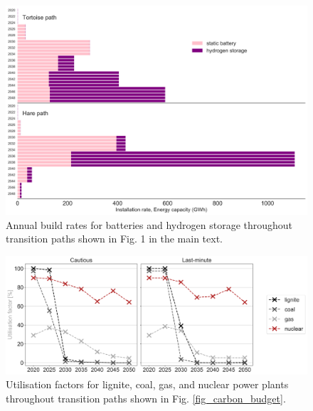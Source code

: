 \documentclass[3p]{elsarticle} %
\begin{document}
\begin{figure}[!h]
\centering
\includegraphics[width=0.8\columnwidth]{figures/storage_expansion_w_TYNDP.png}
\caption{Annual build rates for batteries and hydrogen storage throughout transition paths shown in Fig. 1 in the main text.} \label{fig_battery_hydrogen} 
\end{figure}

\begin{figure}[!h]
\centering
\includegraphics[width=\columnwidth]{figures/utilisation_factors_w_TYNDP.png}
\caption{Utilisation factors for lignite, coal, gas, and nuclear power plants throughout transition paths shown in Fig. \ref{fig_carbon_budget}.} \label{fig_utilisation_factors} 
\end{figure}
\end{document}
